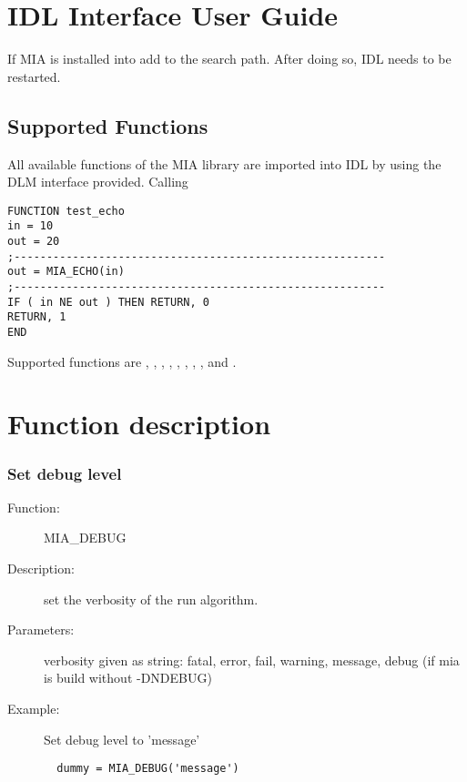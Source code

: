 \section{IDL Interface User Guide}

If MIA is installed into  add  to the  search path. 
After doing so, IDL needs to be restarted. 

\subsection{Supported Functions}

All available functions of the MIA library are imported into IDL by using the DLM interface provided. 
Calling 

\lstset{language=bash}
\begin{lstlisting}
FUNCTION test_echo
in = 10
out = 20
;---------------------------------------------------------
out = MIA_ECHO(in)
;---------------------------------------------------------
IF ( in NE out ) THEN RETURN, 0
RETURN, 1
END
\end{lstlisting}

\noindent 
Supported functions are  , , , , , , , 
  , and . 

\section{Function description}

\subsubsection*{Set debug level}

\begin{description}
\item [Function:] MIA\_DEBUG
\item [Description:] set the verbosity of the run algorithm.
\item [Parameters:] verbosity given as string: fatal, error, fail, warning, message, debug (if mia is build without -DNDEBUG)
\item [Example:] Set debug level to 'message'
\begin{lstlisting}
  dummy = MIA_DEBUG('message')
\end{lstlisting}
\end{description}


